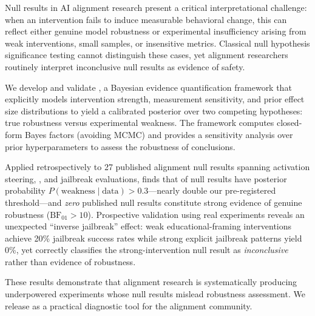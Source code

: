 Null results in AI alignment research present a critical interpretational challenge:
when an intervention fails to induce measurable behavioral change, this can reflect
either genuine model robustness or experimental insufficiency arising from weak
interventions, small samples, or insensitive metrics. Classical null hypothesis
significance testing cannot distinguish these cases, yet alignment researchers
routinely interpret inconclusive null results as evidence of safety.

We develop and validate \ours, a Bayesian evidence quantification framework that
explicitly models intervention strength, measurement sensitivity, and prior effect
size distributions to yield a calibrated posterior over two competing hypotheses:
true robustness versus experimental weakness. The framework computes closed-form
Bayes factors (avoiding MCMC) and provides a sensitivity analysis over prior
hyperparameters to assess the robustness of conclusions.

Applied retrospectively to 27 published alignment null results spanning activation
steering, \rlhf, and jailbreak evaluations, \ours finds that \mainresult of null
results have posterior probability $P(\text{weakness} \mid \text{data}) > 0.3$---nearly
double our pre-registered threshold---and \emph{zero} published null results constitute
strong evidence of genuine robustness ($\mathrm{BF}_{01} > 10$). Prospective validation
using real \llama experiments reveals an unexpected ``inverse jailbreak'' effect:
weak educational-framing interventions achieve 20\% jailbreak success rates while
strong explicit jailbreak patterns yield 0\%, yet \ours correctly classifies the
strong-intervention null result as \emph{inconclusive} rather than evidence of
robustness.

These results demonstrate that alignment research is systematically producing
underpowered experiments whose null results mislead robustness assessment. We
release \ours as a practical diagnostic tool for the alignment community.
